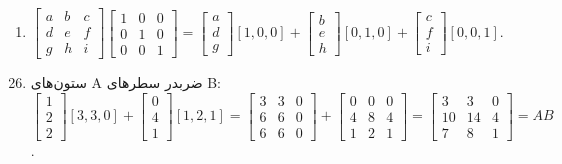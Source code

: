 \documentclass[12pt,a4paper]{article}
\begin{document}
{\begin{enumerate}
			\item $\begin{bmatrix} a & b & c \\ d & e & f \\ g & h & i \end{bmatrix} \begin{bmatrix} 1 & 0 & 0 \\ 0 & 1 & 0 \\ 0 & 0 & 1 \end{bmatrix} = \begin{bmatrix} a \\ d \\ g \end{bmatrix} [1,0,0] + \begin{bmatrix} b \\ e \\ h \end{bmatrix} [0,1,0] + \begin{bmatrix} c \\ f \\ i \end{bmatrix} [0,0,1]$.
		\end{enumerate}
		
	
		\begin{enumerate}
			\setcounter{enumi}{25}
			\item ستون‌های A ضربدر سطرهای B:
			$\begin{bmatrix} 1 \\ 2 \\ 2 \end{bmatrix} [3,3,0] + \begin{bmatrix} 0 \\ 4 \\ 1 \end{bmatrix} [1,2,1] = \begin{bmatrix} 3 & 3 & 0 \\ 6 & 6 & 0 \\ 6 & 6 & 0 \end{bmatrix} + \begin{bmatrix} 0 & 0 & 0 \\ 4 & 8 & 4 \\ 1 & 2 & 1 \end{bmatrix} = \begin{bmatrix} 3 & 3 & 0 \\ 10 & 14 & 4 \\ 7 & 8 & 1 \end{bmatrix} = AB$.
			

\end{enumerate}}
\end{document}
